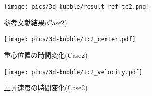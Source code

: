\begin{figure}[H]
    \centering
	\texttt{[image: pics/3d-bubble/result-ref-tc2.png]}
	\caption{参考文献結果(Case2)\cite{Safi2017}}
	\label{fig:3d-bubble-result-ref}
\end{figure}

\begin{figure}[H]
	\centering
	\begin{minipage}[b]{0.49\columnwidth}
	    \centering
	    \texttt{[image: pics/3d-bubble/tc2\_center.pdf]}
		\caption{重心位置の時間変化(Case2)}
		\label{fig:3d-bubble-center-tc2}
	\end{minipage}
	\begin{minipage}[b]{0.49\columnwidth}
	    \centering
	    \texttt{[image: pics/3d-bubble/tc2\_velocity.pdf]}
		\caption{上昇速度の時間変化(Case2)}
		\label{fig:3d-bubble-velocity-tc2}
	\end{minipage}
\end{figure}
